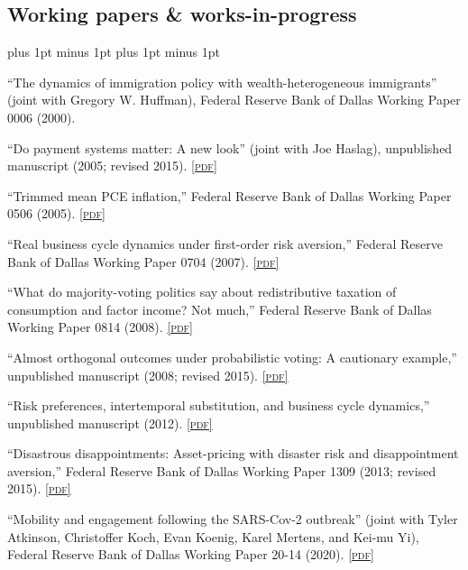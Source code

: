 \documentclass[letterpaper]{article}
\renewenvironment{itemize}{
  \begin{list}{}{
    \setlength{\leftmargin}{1.5em}
    \itemsep -1pt plus 1pt minus 1pt
    \topsep -1pt plus 1pt minus 1pt
  }
}{
  \end{list}
}
\newcommand{\pdf}[1]{\href{#1}{\scriptsize\textsc{[pdf]}}}
\begin{document}
\subsection*{Working papers \& works-in-progress}
\begin{itemize}
\item ``The dynamics of immigration policy with wealth-heterogeneous immigrants'' (joint with Gregory W. Huffman), Federal Reserve Bank of Dallas Working Paper 0006 (2000).

\item ``Do payment systems matter: A new look'' (joint with Joe Haslag), unpublished manuscript (2005; revised 2015). \pdf{https://jimdolmas.github.io/assets/payment_systems.pdf}

\item ``Trimmed mean PCE inflation,'' Federal Reserve Bank of Dallas Working Paper 0506 (2005). \pdf{http://www.dallasfed.org/assets/documents/research/papers/2005/wp0506.pdf}

\item ``Real business cycle dynamics under first-order risk aversion,'' Federal Reserve Bank of Dallas Working Paper 0704 (2007). \pdf{http://www.dallasfed.org/assets/documents/research/papers/2007/wp0704.pdf}

\item ``What do majority-voting politics say about redistributive taxation of consumption and factor income? Not much,'' Federal Reserve Bank of Dallas Working Paper 0814 (2008). \pdf{http://www.dallasfed.org/assets/documents/research/papers/2008/wp0814.pdf}

\item ``Almost orthogonal outcomes under probabilistic voting: A cautionary example,'' unpublished manuscript (2008; revised 2015). \pdf{https://jimdolmas.github.io/assets/probvote_final.pdf}

\item ``Risk preferences, intertemporal substitution, and business cycle dynamics,'' unpublished manuscript (2012). \pdf{https://jimdolmas.github.io/assets/habit.pdf}

\item ``Disastrous disappointments: Asset-pricing with disaster risk and disappointment aversion,'' Federal Reserve Bank of Dallas Working Paper 1309 (2013; revised 2015). \pdf{https://jimdolmas.github.io/assets/disastrous.pdf}

\item ``Mobility and engagement following the SARS-Cov-2 outbreak'' (joint with Tyler Atkinson, Christoffer Koch, Evan Koenig, Karel Mertens, and Kei-mu Yi), Federal Reserve Bank of Dallas Working Paper 20-14 (2020). \pdf{https://www.dallasfed.org/-/media/documents/research/papers/2020/wp2014.pdf}

\end{itemize}
\end{document}
